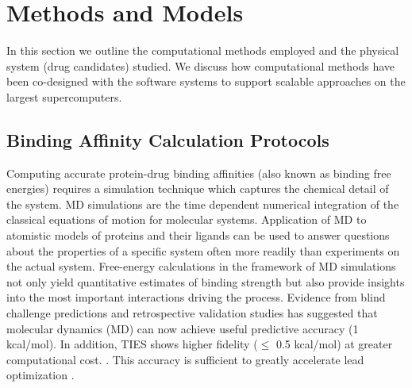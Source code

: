 \documentclass[conference]{IEEEtran}
\begin{document}





 
\section{Methods and Models}

In this section we outline the computational methods employed and the physical
system (drug candidates) studied. We discuss how computational methods have
been co-designed with the software systems to support scalable approaches on
the largest supercomputers.

\subsection{Binding Affinity Calculation Protocols}\label{sec:bac}

Computing accurate protein-drug binding affinities (also known as binding free
energies) requires a simulation technique which captures the chemical detail
of the system. MD simulations are the time dependent numerical integration of
the classical equations of motion for molecular systems. Application of MD to
atomistic models of proteins and their ligands can be used to answer questions
about the properties of a specific system often more readily than experiments
on the actual system. Free-energy calculations in the framework of MD
simulations not only yield quantitative estimates of binding strength but also
provide insights into the most important interactions driving the process.
Evidence from blind challenge predictions and retrospective validation studies
has suggested that molecular dynamics (MD) can now achieve useful predictive
accuracy (1 kcal/mol). In addition, TIES shows higher fidelity ($\leq$ 0.5 kcal/mol) at greater computational cost.
\cite{shirts-mobley-chodera:2007:annu-rep-comput-chem:prime-time, abel:jacs:2015:fep-plus}. This accuracy is sufficient to greatly
accelerate lead optimization \cite{shirts-mobley-brown:2009:sbdd}.
\end{document}
